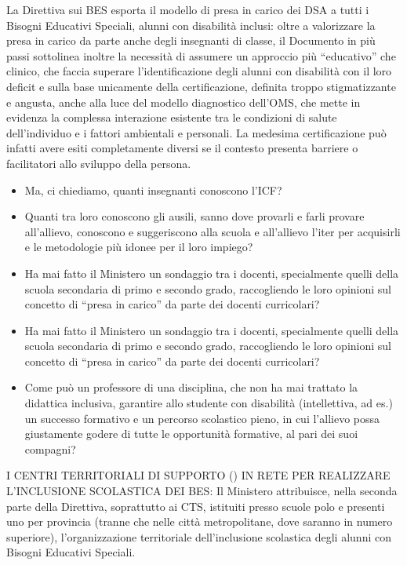 La Direttiva sui BES esporta il modello di presa in carico dei DSA a tutti i Bisogni Educativi Speciali,
alunni con disabilità inclusi: oltre a valorizzare la presa in carico da parte anche degli insegnanti
di classe, il Documento in più passi sottolinea inoltre la necessità di assumere un approccio più
“educativo” che clinico, che faccia superare l'identificazione degli alunni con disabilità con il loro
deficit e sulla base unicamente della certificazione, definita troppo stigmatizzante e angusta,
anche alla luce del modello diagnostico  dell'OMS, che mette in evidenza la complessa
interazione esistente tra le condizioni di salute dell'individuo e i fattori ambientali e personali. La
medesima certificazione può infatti avere esiti completamente diversi se il contesto presenta
barriere o facilitatori allo sviluppo della persona.
\begin{itemize}
	\item Ma, ci chiediamo, quanti insegnanti conoscono l'ICF?
	\item Quanti tra loro conoscono gli ausili, sanno dove provarli e farli provare all'allievo,
	conoscono e suggeriscono alla scuola e all'allievo l'iter per acquisirli e le
	metodologie più idonee per il loro impiego?
	\item Ha mai fatto il Ministero un sondaggio tra i docenti, specialmente quelli della
	scuola secondaria di primo e secondo grado, raccogliendo le loro opinioni sul
	concetto di “presa in carico” da parte dei docenti curricolari?
	\item Ha mai fatto il Ministero un sondaggio tra i docenti, specialmente quelli della
	scuola secondaria di primo e secondo grado, raccogliendo le loro opinioni sul
	concetto di “presa in carico” da parte dei docenti curricolari?
	\item Come può un professore di una disciplina, che non ha mai trattato la didattica
	inclusiva, garantire allo studente con disabilità (intellettiva, ad es.) un successo
	formativo e un percorso scolastico pieno, in cui l'allievo possa giustamente godere
	di tutte le opportunità formative, al pari dei suoi compagni?
\end{itemize}
I CENTRI TERRITORIALI DI SUPPORTO () IN RETE PER REALIZZARE L'INCLUSIONE SCOLASTICA
DEI BES: Il Ministero attribuisce, nella seconda parte della Direttiva, soprattutto ai CTS, istituiti
presso scuole polo e presenti uno per provincia (tranne che nelle città metropolitane, dove
saranno in numero superiore), l'organizzazione territoriale dell'inclusione scolastica degli alunni
con Bisogni Educativi Speciali.

